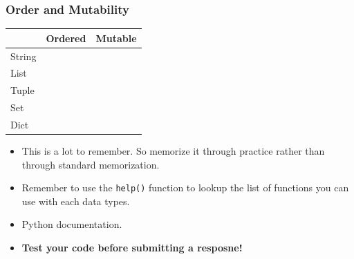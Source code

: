 \documentclass[xcolor=table]{beamer}
\begin{document}
%
%
\begin{frame}[fragile]
  \frametitle{Order and Mutability}
  \begin{table}[]
    \begin{tabular}{l|l|l}
      \hline
      \multicolumn{1}{c|}{}       & \multicolumn{1}{c|}{Ordered}                  & \multicolumn{1}{c}{Mutable}                  \\ \hline
      \multicolumn{1}{c|}{String} & \multicolumn{1}{c|}{\cellcolor[HTML]{34FF34}} & \multicolumn{1}{c}{\cellcolor[HTML]{FE0000}} \\ \hline
      List                        & \cellcolor[HTML]{34FF34}                      & \cellcolor[HTML]{34FF34}                     \\ \hline
      Tuple                       & \cellcolor[HTML]{34FF34}                      & \cellcolor[HTML]{FE0000}                     \\ \hline
      Set                         & \cellcolor[HTML]{FE0000}                      & \cellcolor[HTML]{34FF34}                     \\ \hline
      Dict                        & \cellcolor[HTML]{FE0000}                      & \cellcolor[HTML]{34FF34}                     \\ \hline
    \end{tabular}
  \end{table}
  \pause
  \begin{itemize}
      \pause
      \item This is a lot to remember. So memorize it through practice rather than through standard memorization. 
      \pause
      \item Remember to use the \lstinline|help()| function to lookup the list of functions you can use with each data types.
      \pause
      \item Python documentation.
      \pause
      \item \textbf{Test your code before submitting a resposne!}
  \end{itemize}
\end{frame}
\end{document}
